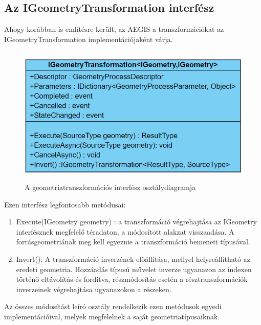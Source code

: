 \subsection{Az IGeometryTransformation interfész}
Ahogy korábban is említésre került, az AEGIS a transzformációkat az IGeometryTransformation implementációjaként várja. 
\begin{figure}[H]
	\centering
	\includegraphics[width=\textwidth,height=250px]{images/GeomTransformIface.png}
	\caption{A geometriatranszformációs interfész osztálydiagramja}
	\label{fig:picture-5}
\end{figure}
Ezen interfész legfontosabb metódusai:
\begin{enumerate}
	\item Execute(IGeometry geometry) : a transzformáció végrehajtása az IGeometry interfésznek megfelelő téradaton, a módosított alakzat visszaadása. A forrásgeometriának meg kell egyeznie a transzformáció bemeneti típusával.
	\item Invert(): A transzformáció inverzének előállítása, mellyel helyreállítható az eredeti geometria. Hozzáadás típusú művelet inverze ugyanazon az indexen történő eltávolítás és fordítva, részmódosítás esetén a résztranszformációk inverzeinek végrehajtása ugyanazokon a részeken.
\end{enumerate}
Az összes módosítást leíró osztály rendelkezik ezen metódusok egyedi implementációival, melyek megfelelnek a saját geometriatípusaiknak.
